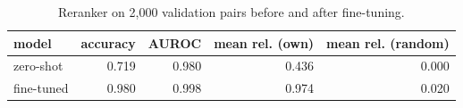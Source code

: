 \begin{table}[t]
\centering
\caption{Reranker on 2,000 validation pairs before and after fine-tuning.}
\label{tab:tab_reranker}
\begin{tabular}{lrrrr}
\toprule
model & accuracy & AUROC & mean rel. (own) & mean rel. (random) \\
\midrule
zero-shot & 0.719 & 0.980 & 0.436 & 0.000 \\
fine-tuned & 0.980 & 0.998 & 0.974 & 0.020 \\
\bottomrule
\end{tabular}
\end{table}
